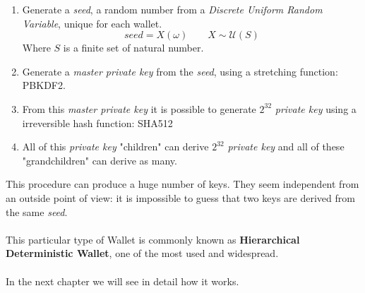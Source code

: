 \begin{enumerate}[label=(\roman*)]
	\item Generate a \textit{seed}, a random number from a \textit{Discrete Uniform Random Variable}, unique for each wallet.
	\begin{equation*}
	seed=X(\omega) \qquad X\sim \mathcal{U}(S)
	\end{equation*}
	Where $S$ is a finite set of natural number.
	\item Generate a \textit{master private key} from the \textit{seed}, using a stretching function: PBKDF2.
	\item From this \textit{master private key} it is possible to generate $2^{32}$ \textit{private key} using a irreversible hash function: SHA512
	\item All of this \textit{private key} "children" can derive $2^{32}$ \textit{private key} and all of these "grandchildren" can derive as many.
\end{enumerate}
This procedure can produce a huge number of keys. They seem independent from an outside point of view: it is impossible to guess that two keys are derived from the same \textit{seed}.
\\ \\ 
This particular type of Wallet is commonly known as \textbf{Hierarchical Deterministic Wallet}, one of the most used and widespread.
\\ \\
In the next chapter we will see in detail how it works.
